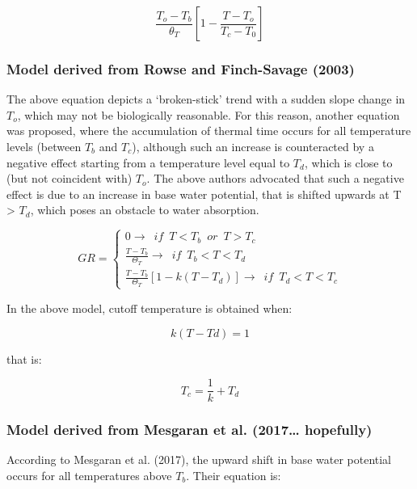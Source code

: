 \documentclass[a4paper,12pt]{article}
\begin{document}
\begin{equation}
\frac{T_o - T_b}{\theta_T} \left[ 1 - \frac{T - T_o}{T_c - T_0} \right]
\end{equation}

\subsubsection{Model derived from Rowse and Finch-Savage
(2003)}\label{model-derived-from-rowse2003_hydrotime}

The above equation depicts a `broken-stick' trend with a sudden slope
change in \(T_o\), which may not be biologically reasonable. For this
reason, another equation was proposed, where the accumulation of thermal
time occurs for all temperature levels (between \(T_b\) and \(T_c\)),
although such an increase is counteracted by a negative effect starting
from a temperature level equal to \(T_d\), which is close to (but not
coincident with) \(T_o\). The above authors advocated that such a
negative effect is due to an increase in base water potential, that is
shifted upwards at T \textgreater{} \(T_d\), which poses an obstacle to
water absorption.

\begin{equation}
GR = \left\{ {\begin{array}{*{20}{l}}
0 \rightarrow \,\,\, if \,\,\, T < T_b \,\,\, or \,\,\, T > T_c \\
\frac{T - T_b}{\Theta_T} \rightarrow \,\,\, if \,\,\, T_b < T < T_d \\
\frac{T - T_b}{\Theta_T} \left[ 1 - k (T - T_d) \right] \rightarrow \,\,\, if \,\,\, T_d < T < T_c 
\end{array}} \right.
\end{equation}

In the above model, cutoff temperature is obtained when:

\[ k(T - Td) = 1 \]

that is:

\[ T_c = \frac{1}{k} + T_d\]

\subsubsection{Model derived from Mesgaran et al. (2017\ldots{}
hopefully)}\label{model-derived-from-mesgaran-et-al.-2017-hopefully}

According to Mesgaran et al. (2017), the upward shift in base water
potential occurs for all temperatures above \(T_b\). Their equation is:
\end{document}
